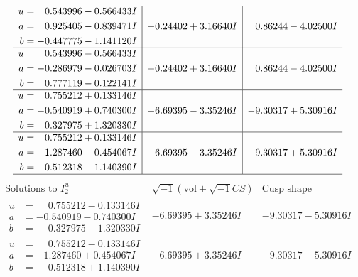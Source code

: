 \documentclass[1p]{elsarticle_modified}
\theoremstyle{definition}
\newcommand{\I}{\sqrt{-1}}
\begin{document}
$$\begin{array}{c|c|c}
\begin{aligned}
u &= \phantom{-}0.543996 - 0.566433 I \\
a &= \phantom{-}0.925405 - 0.839471 I \\
b &= -0.447775 - 1.141120 I\end{aligned}
 & -0.24402 + 3.16640 I & \phantom{-}0.86244 - 4.02500 I \\ \hline\begin{aligned}
u &= \phantom{-}0.543996 - 0.566433 I \\
a &= -0.286979 - 0.026703 I \\
b &= \phantom{-}0.777119 - 0.122141 I\end{aligned}
 & -0.24402 + 3.16640 I & \phantom{-}0.86244 - 4.02500 I \\ \hline\begin{aligned}
u &= \phantom{-}0.755212 + 0.133146 I \\
a &= -0.540919 + 0.740300 I \\
b &= \phantom{-}0.327975 + 1.320330 I\end{aligned}
 & -6.69395 - 3.35246 I & -9.30317 + 5.30916 I \\ \hline\begin{aligned}
u &= \phantom{-}0.755212 + 0.133146 I \\
a &= -1.287460 - 0.454067 I \\
b &= \phantom{-}0.512318 - 1.140390 I\end{aligned}
 & -6.69395 - 3.35246 I & -9.30317 + 5.30916 I\\
 \hline 
 \end{array}$$\newpage$$\begin{array}{c|c|c}  
\text{Solutions to }I^u_{2}& \I (\text{vol} + \sqrt{-1}CS) & \text{Cusp shape}\\
 \hline 
\begin{aligned}
u &= \phantom{-}0.755212 - 0.133146 I \\
a &= -0.540919 - 0.740300 I \\
b &= \phantom{-}0.327975 - 1.320330 I\end{aligned}
 & -6.69395 + 3.35246 I & -9.30317 - 5.30916 I \\ \hline\begin{aligned}
u &= \phantom{-}0.755212 - 0.133146 I \\
a &= -1.287460 + 0.454067 I \\
b &= \phantom{-}0.512318 + 1.140390 I\end{aligned}
 & -6.69395 + 3.35246 I & -9.30317 - 5.30916 I \\ \hline\begin{aligned}

\end{aligned}
\end{array}$$
\end{document}
